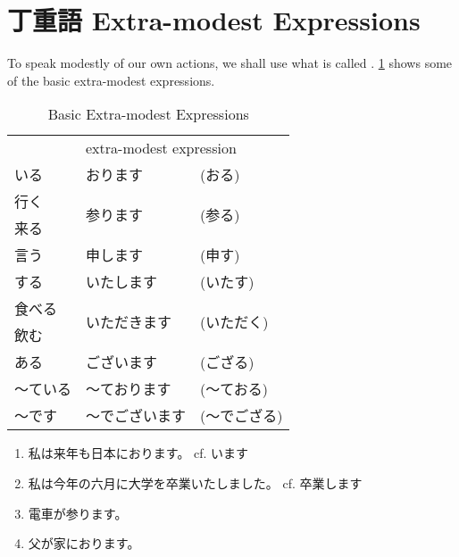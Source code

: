 \documentclass[notoc,notitlepage]{tufte-book}
\begin{document}

\section{丁重語 Extra-modest Expressions}%
\label{sec:teichougo_extra_modest_expressions}

To speak modestly of our own actions, we shall use what is called
.
\cref{table:basic_extra_modest_expressions} shows some of the basic
extra-modest expressions.

\begin{table}[ht]
  \centering
  \caption{Basic Extra-modest Expressions}
  \label{table:basic_extra_modest_expressions}
  \begin{tabular}{l l l}
             & \multicolumn{2}{l}{extra-modest expression} \\
    いる     & おります                      & (おる) \\
    行く     & \multirow{2}{*}{参ります}     & \multirow{2}{*}{(参る)} \\
    来る     &                               & \\
    言う     & 申します                      & (申す) \\
    する     & いたします                    & (いたす) \\
    食べる   & \multirow{2}{*}{いただきます} & \multirow{2}{*}{(いただく)} \\
    飲む     &                               & \\
    ある     & ございます                    & (ござる) \\
    〜ている & 〜ております                  & (〜ておる) \\
    〜です   & 〜でございます                & (〜でござる)
  \end{tabular}
\end{table}

\begin{eg}
  \begin{enumerate}
    \item 私は来年も日本におります。 cf. います
    \item 私は今年の六月に大学を卒業いたしました。 cf. 卒業します
    \item 電車が参ります。
    \item 父が家におります。
  \end{enumerate}
\end{eg}
\end{document}

